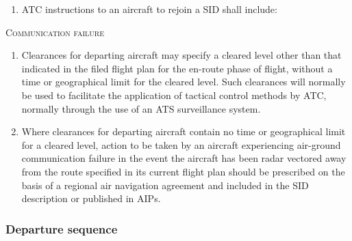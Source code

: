 \documentclass[../vATM.tex]{subfiles}
\begin{document}
\begin{enumeratesc}
\begin{enumerate}
            \item ATC instructions to an aircraft to rejoin a SID shall include:

            
            
        \end{enumerate}

        \item \textsc{Communication failure}
        \begin{enumerate}
            \item Clearances for departing aircraft may specify a cleared level other than that indicated in the filed flight plan for the en-route phase of flight, without a time or geographical limit for the cleared level. Such clearances will normally be used to facilitate the application of tactical control methods by ATC, normally through the use of an ATS surveillance system.
            \item Where clearances for departing aircraft contain no time or geographical limit for a cleared level, action to be taken by an aircraft experiencing air-ground communication failure in the event the aircraft has been radar vectored away from the route specified in its current flight plan should be prescribed on the basis of a regional air navigation agreement and included in the SID description or published in AIPs.
        \end{enumerate}
    \end{enumeratesc}

    \subsubsection{Departure sequence}
\end{document}
